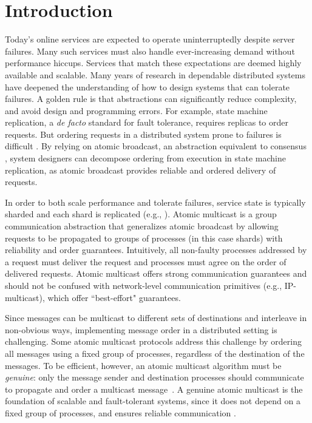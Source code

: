 \section{Introduction}
\label{sec:introduction}

Today's online services are expected to operate uninterruptedly despite server failures.
Many such services must also handle ever-increasing demand without performance hiccups.
Services that match these expectations are deemed highly available and scalable.
Many years of research in dependable distributed systems have deepened the understanding of how to design systems that can tolerate failures.
A golden rule is that abstractions can significantly reduce complexity, and avoid design and programming errors.
For example, state machine replication, a \emph{de facto} standard for fault tolerance, requires replicas to order requests.
But ordering requests in a distributed system prone to failures is difficult \cite{FLP85}.
By relying on atomic broadcast, an abstraction equivalent to consensus \cite{HT93,CT96}, system designers can decompose ordering from execution in state machine replication, as atomic broadcast provides reliable and ordered delivery of requests.

In order to both scale performance and tolerate failures, service state is typically sharded and each shard is replicated (e.g., \cite{CDE12,Long2019,Aguilera:2007}).
Atomic multicast is a group communication abstraction that generalizes atomic broadcast by allowing requests to be propagated to groups of processes (in this case shards) with reliability and order guarantees.
Intuitively, all non-faulty processes addressed by a request must deliver the request and processes must agree on the order of delivered requests.
Atomic multicast offers strong communication guarantees and should not be confused with network-level communication primitives (e.g., IP-multicast), which offer ``best-effort" guarantees.

Since messages can be multicast to different sets of destinations and interleave in non-obvious ways, implementing message order in a distributed setting is challenging.
Some atomic multicast protocols address this challenge by ordering all messages using a fixed group of processes, regardless of the destination of the messages.
To be efficient, however, an atomic multicast algorithm must be \emph{genuine}: only the message sender and destination processes should communicate to propagate and order a multicast message~\cite{GS01b}.
A genuine atomic multicast is the foundation of scalable and fault-tolerant systems, since it does not depend on a fixed group of processes, and ensures reliable communication \cite{Coelho2017}.

